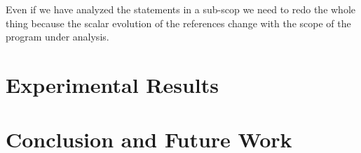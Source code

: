 \documentclass{sigplanconf}
\begin{document}
Even if we have analyzed the statements in a sub-scop we need to redo the whole thing because the scalar evolution
of the references change with the scope of the program under analysis.


\section{Experimental Results}

\section{Conclusion and Future Work}



{\small

}
\end{document}
